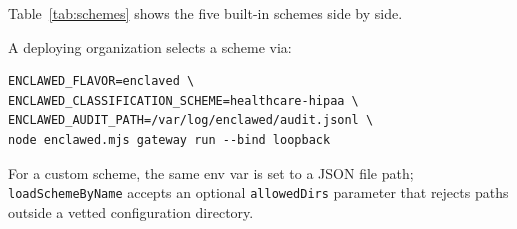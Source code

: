 \documentclass[11pt]{article}
\begin{document}
Table~\ref{tab:schemes} shows the five built-in schemes side by side.

\begin{table}[t]
  \centering
  \footnotesize
  \setlength{\tabcolsep}{3pt}
  \caption{Built-in classification schemes (column headers are scheme
    ids; rank-4 of \texttt{healthcare-hipaa} is RESEARCH-EMBARGOED,
    abbreviated for table fit). Aliases such as \texttt{q-cleared}
    $\equiv$ rank 4 of \texttt{us-government} are accepted by
    \texttt{parse()} and by manifest \texttt{clearance} validation.}
  \label{tab:schemes}
\end{table}

A deploying organization selects a scheme via:

\begin{verbatim}
ENCLAWED_FLAVOR=enclaved \
ENCLAWED_CLASSIFICATION_SCHEME=healthcare-hipaa \
ENCLAWED_AUDIT_PATH=/var/log/enclawed/audit.jsonl \
node enclawed.mjs gateway run --bind loopback
\end{verbatim}

For a custom scheme, the same env var is set to a JSON file path;
\texttt{loadSchemeByName} accepts an optional \texttt{allowedDirs}
parameter that rejects paths outside a vetted configuration directory.

\end{document}
